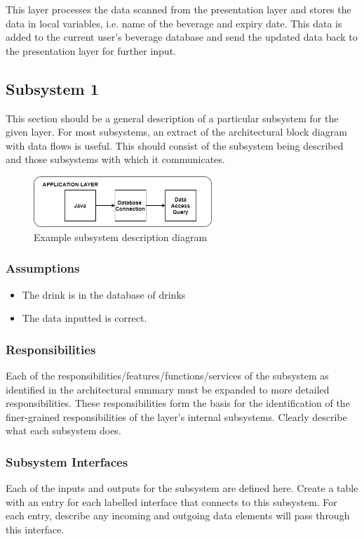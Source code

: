 This layer processes the data scanned from the presentation layer and stores the data in local variables, i.e. name 
of the beverage and expiry date. This data is added to the current user's beverage database and send the updated data
back to the presentation layer for further input.

\subsection{Subsystem 1}
This section should be a general description of a particular subsystem for the given layer. For most subsystems, 
an extract of the architectural block diagram with data flows is useful. This should consist of the subsystem 
being described and those subsystems with which it communicates.

\begin{figure}[h!]
	\centering
 	\includegraphics[width=0.60\textwidth]{images/App.jpg}
 \caption{Example subsystem description diagram}
\end{figure}

\subsubsection{Assumptions}
\begin{itemize}
    \item The drink is in the database of drinks
    \item The data inputted is correct.
\end{itemize}

\subsubsection{Responsibilities}
Each of the responsibilities/features/functions/services of the subsystem as identified in the architectural 
summary must be expanded to more detailed responsibilities. These responsibilities form the basis for the 
identification of the finer-grained responsibilities of the layer's internal subsystems. Clearly describe what 
each subsystem does.

\subsubsection{Subsystem Interfaces}
Each of the inputs and outputs for the subsystem are defined here. Create a table with an entry for each labelled 
interface that connects to this subsystem. For each entry, describe any incoming and outgoing data elements will 
pass through this interface.

